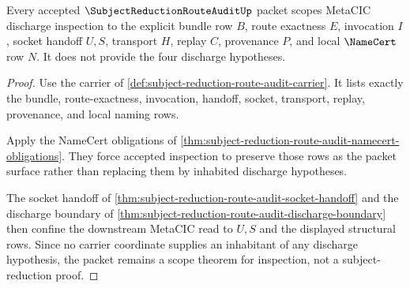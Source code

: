 \begin{theorem}
\label{thm:subject-reduction-route-audit-discharge-socket-scope}
Every accepted $\SubjectReductionRouteAuditUp$ packet scopes MetaCIC discharge inspection to the explicit bundle row $B$, route exactness $E$, invocation $I$, socket handoff $U,S$, transport $H$, replay $C$, provenance $P$, and local $\NameCert$ row $N$. It does not provide the four discharge hypotheses.
\end{theorem}
\begin{proof}
Use the carrier of \autoref{def:subject-reduction-route-audit-carrier}. It lists exactly the bundle, route-exactness, invocation, handoff, socket, transport, replay, provenance, and local naming rows.

Apply the NameCert obligations of \autoref{thm:subject-reduction-route-audit-namecert-obligations}. They force accepted inspection to preserve those rows as the packet surface rather than replacing them by inhabited discharge hypotheses.

The socket handoff of \autoref{thm:subject-reduction-route-audit-socket-handoff} and the discharge boundary of \autoref{thm:subject-reduction-route-audit-discharge-boundary} then confine the downstream MetaCIC read to $U,S$ and the displayed structural rows. Since no carrier coordinate supplies an inhabitant of any discharge hypothesis, the packet remains a scope theorem for inspection, not a subject-reduction proof.
\end{proof}

